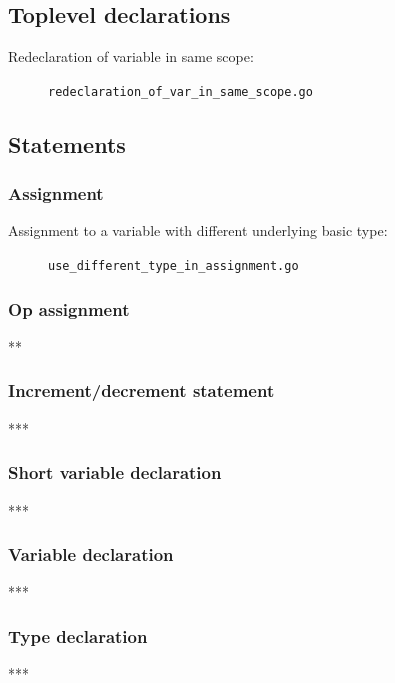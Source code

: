 \documentclass[oneside]{article}
\begin{document}
\subsection{Toplevel declarations}

\begin{description}
  \item[Redeclaration of variable in same scope:] \verb|redeclaration_of_var_in_same_scope.go|
\end{description}

\subsection{Statements}

\subsubsection{Assignment}
\begin{description}
  \item[Assignment to a variable with different underlying basic type:] \verb|use_different_type_in_assignment.go|
\end{description}

\subsubsection{Op assignment}
\begin{description}
  \item ***
\end{description}

\subsubsection{Increment/decrement statement}
***

\subsubsection{Short variable declaration}
***

\subsubsection{Variable declaration}
***

\subsubsection{Type declaration}
***
\end{document}
